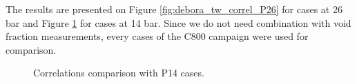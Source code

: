 The results are presented on Figure \ref{fig:debora_tw_correl_P26} for cases at 26 bar and Figure \ref{fig:debora_tw_correl_P14} for cases at 14 bar. Since we do not need combination with void fraction measurements, every cases of the C800 campaign were used for comparison.


\begin{figure}[h!]
\centering

\caption{Correlations comparison with P14 cases.}
\label{fig:debora_tw_correl_P14}
\end{figure}


